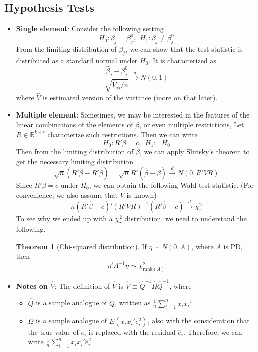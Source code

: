 \documentclass[12pt]{article}
\theoremstyle{definition}
\theoremstyle{property}
\theoremstyle{assumption}
\theoremstyle{example}
\theoremstyle{comment}
\newtheorem{theorem}{Theorem}[section]
\begin{document}
\subsection{Hypothesis Tests}
\begin{itemize}
\item \textbf{Single element}: Consider the following setting
\[
H_0: \beta_j = \beta_j^0, \ \ H_1:\beta_j \neq \beta_j^0
\]
From the limiting distribution of $\beta_j$, we can show that the test statistic is distributed as a standard normal under $H_0$.  It is characterized as
\[
\frac{\hat{\beta}_j-\beta_j^0}{\sqrt{\widehat{V}_{jj}/n}}\xrightarrow{d}N(0,1)
\]
where $\widehat{V}$ is estimated version of the variance (more on that later). 
\item \textbf{Multiple element}: Sometimes, we may be interested in the features of the linear combinations of the elements of $\beta$, or even multiple restrictions, Let $R\in\mathbb{R}^{k\times r}$ characterize such restrictions. Then we can write
\[
H_0 : R'\beta = c, \ \ H_1: \lnot H_0
\]
Then from the limiting distribution of $\hat{\beta}$, we can apply Slutsky's theorem to get the necessary limiting distribution
\[
\sqrt{n}(R'\hat{\beta}-R'\beta)=\sqrt{n}R'(\hat{\beta}-\beta)\xrightarrow{d}N(0,R'VR)
\]
Since $ R'\beta = c$ under $H_0$,  we can obtain the following Wald test statistic. (For convenience, we also assume that $V$ is known)
\[
n(R'\hat{\beta}-c)'(R'VR)^{-1}(R'\hat{\beta}-c)\xrightarrow{d}\chi^2_r
\]
To see why we ended up with a $\chi_r^2$ distribution, we need to understand the following. 
\begin{mdframed}[backgroundcolor=green!5] 
\begin{theorem}[Chi-squared distribution]
If $\eta\sim N(0,A)$, where $A$ is PD, then 
\[
\eta'A^{-1}\eta\sim \chi^2_{\text{rank}(A)}
\]
\end{theorem}
\end{mdframed} \par
\item \textbf{Notes on $\widehat{V}$}: The definition of $\widehat{V}$ is $\widehat{V}\equiv\widehat{Q}^{-1}\widehat{\Omega}\widehat{Q}^{-1}$, where
\begin{itemize}
\item $\widehat{Q}$ is a sample analogue of $Q$, written as $\frac{1}{n}\sum_{i=1}^nx_ix_i'$
\item $\widehat{\Omega}$ is a sample analogue of $E(x_ix_i'e_i^2)$, also with the consideration that the true value of $e_i$ is replaced with the residual $\hat{e}_i$. Therefore, we can write $\frac{1}{n}\sum_{i=1}^nx_ix_i'\hat{e}_i^2$
\end{itemize}
\end{itemize}
\end{document}
